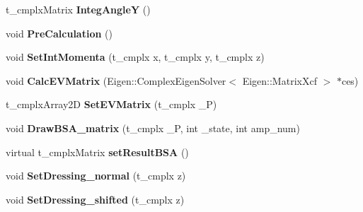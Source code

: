 \begin{DoxyCompactItemize}
\item 
\hypertarget{class_c___b_s_e___hadron___base_a256a67beff9e2f502e597f3b9a0489cb}{t\-\_\-cmplx\-Matrix {\bfseries Integ\-Angle\-Y} ()}\label{class_c___b_s_e___hadron___base_a256a67beff9e2f502e597f3b9a0489cb}

\item 
\hypertarget{class_c___b_s_e___hadron___base_a01458d27cf619f76be654e30249c3433}{void {\bfseries Pre\-Calculation} ()}\label{class_c___b_s_e___hadron___base_a01458d27cf619f76be654e30249c3433}

\item 
\hypertarget{class_c___b_s_e___hadron___base_a0709c4d8594aca1eb86700f3cb4e5f8b}{void {\bfseries Set\-Int\-Momenta} (t\-\_\-cmplx x, t\-\_\-cmplx y, t\-\_\-cmplx z)}\label{class_c___b_s_e___hadron___base_a0709c4d8594aca1eb86700f3cb4e5f8b}

\item 
\hypertarget{class_c___b_s_e___hadron___base_a7b14c1b5ab48f07d8c8340a8d95c1486}{void {\bfseries Calc\-E\-V\-Matrix} (Eigen\-::\-Complex\-Eigen\-Solver$<$ Eigen\-::\-Matrix\-Xcf $>$ $\ast$ces)}\label{class_c___b_s_e___hadron___base_a7b14c1b5ab48f07d8c8340a8d95c1486}

\item 
\hypertarget{class_c___b_s_e___hadron___base_a84bf41ec480d09b3432c860afba029cb}{t\-\_\-cmplx\-Array2\-D {\bfseries Set\-E\-V\-Matrix} (t\-\_\-cmplx \-\_\-\-P)}\label{class_c___b_s_e___hadron___base_a84bf41ec480d09b3432c860afba029cb}

\item 
\hypertarget{class_c___b_s_e___hadron___base_ae62d2013267ece2bee208b81f5660ba3}{void {\bfseries Draw\-B\-S\-A\-\_\-matrix} (t\-\_\-cmplx \-\_\-\-P, int \-\_\-state, int amp\-\_\-num)}\label{class_c___b_s_e___hadron___base_ae62d2013267ece2bee208b81f5660ba3}

\item 
\hypertarget{class_c___b_s_e___hadron___base_a70e5eeedcf5c2183e61e5697db45a7fb}{virtual t\-\_\-cmplx\-Matrix {\bfseries set\-Result\-B\-S\-A} ()}\label{class_c___b_s_e___hadron___base_a70e5eeedcf5c2183e61e5697db45a7fb}

\item 
\hypertarget{class_c___b_s_e___hadron___base_ad470cdb48e694597781bed50ec63ca37}{void {\bfseries Set\-Dressing\-\_\-normal} (t\-\_\-cmplx z)}\label{class_c___b_s_e___hadron___base_ad470cdb48e694597781bed50ec63ca37}

\item 
\hypertarget{class_c___b_s_e___hadron___base_a38ad9fee736902dd6fc6d2281b30c974}{void {\bfseries Set\-Dressing\-\_\-shifted} (t\-\_\-cmplx z)}\label{class_c___b_s_e___hadron___base_a38ad9fee736902dd6fc6d2281b30c974}


\end{DoxyCompactItemize}

